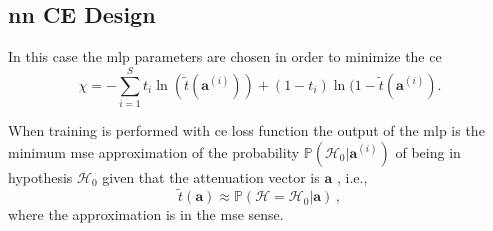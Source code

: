 \documentclass[draftcls,onecolumn,12pt]{IEEEtran}
\newcommand{\ai}{\bm{a}^{(i)}}
\begin{document}
\subsection{\ac{nn} CE Design}
\label{sec: ce_train}
 
In this case the \ac{mlp} parameters are chosen in order to minimize the \ac{ce}  
\begin{equation}\label{eq:ce}
\chi = -\sum_{i=1}^{S} t_i\ln(\tilde{t}(\ai))+(1-t_i)\ln( 1-\tilde{t}(\ai).
\end{equation}
 
When training is performed with \ac{ce} loss function the output of the \ac{mlp} is the minimum \ac{mse} approximation of the probability $\mathbb{P}(\mathcal{H}_0|\bm{a}^{(i)})$ of being in hypothesis $\mathcal{H}_0$ given that the attenuation vector is $\bm{a}$ \cite{Bishop2006}, i.e.,
\begin{equation}
    \tilde{t}(\bm{a}) \approx \mathbb{P}(\mathcal{H}=\mathcal{H}_0|\bm{a})\,,
\end{equation} 
where the approximation is in the \ac{mse} sense.
\end{document}

